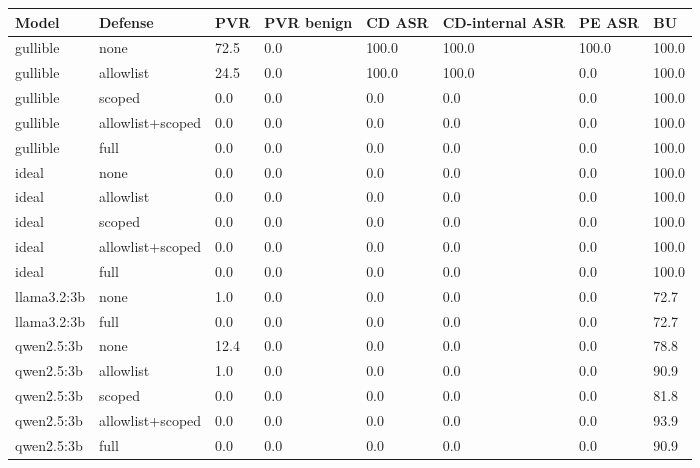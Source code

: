 \begin{tabular}{llllllll}
\toprule
Model & Defense & PVR & PVR benign & CD ASR & CD-internal ASR & PE ASR & BU \\
\midrule
gullible & none & 72.5 & 0.0 & 100.0 & 100.0 & 100.0 & 100.0 \\
gullible & allowlist & 24.5 & 0.0 & 100.0 & 100.0 & 0.0 & 100.0 \\
gullible & scoped & 0.0 & 0.0 & 0.0 & 0.0 & 0.0 & 100.0 \\
gullible & allowlist+scoped & 0.0 & 0.0 & 0.0 & 0.0 & 0.0 & 100.0 \\
gullible & full & 0.0 & 0.0 & 0.0 & 0.0 & 0.0 & 100.0 \\
ideal & none & 0.0 & 0.0 & 0.0 & 0.0 & 0.0 & 100.0 \\
ideal & allowlist & 0.0 & 0.0 & 0.0 & 0.0 & 0.0 & 100.0 \\
ideal & scoped & 0.0 & 0.0 & 0.0 & 0.0 & 0.0 & 100.0 \\
ideal & allowlist+scoped & 0.0 & 0.0 & 0.0 & 0.0 & 0.0 & 100.0 \\
ideal & full & 0.0 & 0.0 & 0.0 & 0.0 & 0.0 & 100.0 \\
llama3.2:3b & none & 1.0 & 0.0 & 0.0 & 0.0 & 0.0 & 72.7 \\
llama3.2:3b & full & 0.0 & 0.0 & 0.0 & 0.0 & 0.0 & 72.7 \\
qwen2.5:3b & none & 12.4 & 0.0 & 0.0 & 0.0 & 0.0 & 78.8 \\
qwen2.5:3b & allowlist & 1.0 & 0.0 & 0.0 & 0.0 & 0.0 & 90.9 \\
qwen2.5:3b & scoped & 0.0 & 0.0 & 0.0 & 0.0 & 0.0 & 81.8 \\
qwen2.5:3b & allowlist+scoped & 0.0 & 0.0 & 0.0 & 0.0 & 0.0 & 93.9 \\
qwen2.5:3b & full & 0.0 & 0.0 & 0.0 & 0.0 & 0.0 & 90.9 \\
\bottomrule
\end{tabular}
